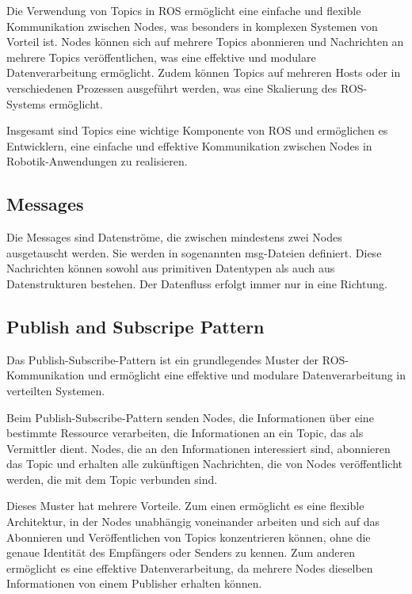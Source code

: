     Die Verwendung von Topics in \ac{ROS} ermöglicht eine einfache und flexible Kommunikation zwischen Nodes, was besonders in komplexen Systemen von Vorteil ist. Nodes können sich auf mehrere Topics abonnieren und Nachrichten an mehrere Topics veröffentlichen, was eine effektive und modulare Datenverarbeitung ermöglicht. Zudem können Topics auf mehreren Hosts oder in verschiedenen Prozessen ausgeführt werden, was eine Skalierung des \ac{ROS}-Systems ermöglicht.

    Insgesamt sind Topics eine wichtige Komponente von \ac{ROS} und ermöglichen es Entwicklern, eine einfache und effektive Kommunikation zwischen Nodes in Robotik-Anwendungen zu realisieren.

    \subsection{Messages} \label{messages:subsection}
    Die Messages sind Datenströme, die zwischen mindestens zwei Nodes ausgetauscht werden. Sie werden in sogenannten msg-Dateien definiert. Diese Nachrichten können sowohl aus primitiven Datentypen als auch aus Datenstrukturen bestehen. Der Datenfluss erfolgt immer nur in eine Richtung.

    \subsection{Publish and Subscripe Pattern} \label{publish_and_subscripe_pattern:subsection}
    Das Publish-Subscribe-Pattern ist ein grundlegendes Muster der \ac{ROS}-Kommunikation und ermöglicht eine effektive und modulare Datenverarbeitung in verteilten Systemen.

    Beim Publish-Subscribe-Pattern senden Nodes, die Informationen über eine bestimmte Ressource verarbeiten, die Informationen an ein Topic, das als Vermittler dient. Nodes, die an den Informationen interessiert sind, abonnieren das Topic und erhalten alle zukünftigen Nachrichten, die von Nodes veröffentlicht werden, die mit dem Topic verbunden sind.

    Dieses Muster hat mehrere Vorteile. Zum einen ermöglicht es eine flexible Architektur, in der Nodes unabhängig voneinander arbeiten und sich auf das Abonnieren und Veröffentlichen von Topics konzentrieren können, ohne die genaue Identität des Empfängers oder Senders zu kennen. Zum anderen ermöglicht es eine effektive Datenverarbeitung, da mehrere Nodes dieselben Informationen von einem Publisher erhalten können.


